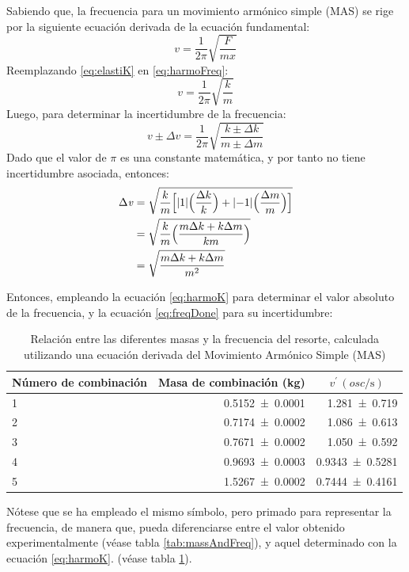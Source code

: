 \documentclass[../main.tex]{subfiles}
\begin{document}
Sabiendo que, la frecuencia para un movimiento armónico simple (MAS) se rige por la siguiente ecuación derivada de la ecuación fundamental:
\begin{equation}
  \mathit{v} = \frac{1}{2\pi} \sqrt{\frac{F}{mx}}
  \label{eq:harmoFreq}
\end{equation}
Reemplazando \ref{eq:elastiK} en \ref{eq:harmoFreq}:
\begin{equation}
  \mathit{v} = \frac{1}{2\pi} \sqrt{\frac{k}{m}}
  \label{eq:harmoK}
\end{equation}
Luego, para determinar la incertidumbre de la frecuencia:
\begin{equation*}
  \mathit{v} \pm \Delta \mathit {v} = \frac{1}{2\pi} \sqrt{\frac{k \pm \Delta k}{m \pm \Delta m}}
\end{equation*}
Dado que el valor de $\pi$ es una constante matemática, y por tanto no tiene incertidumbre asociada, entonces:
\begin{align}
  \Delta \mathit{v} &= \sqrt{\frac{k}{m}\Bigl[\abs{1}\Bigl(\frac{\Delta k}{k}\Bigr) + \abs{-1}\Bigl(\frac{\Delta m}{m}\Bigr)\Bigr]} \nonumber \\
  &= \sqrt{\frac{k}{m} \Bigl(\frac{m \Delta k + k \Delta m}{km}\Bigr)} \nonumber \\
  &= \sqrt{\frac{m \Delta k + k \Delta m}{m^2}}
  \label{eq:freqDone}
\end{align}

Entonces, empleando la ecuación \ref{eq:harmoK} para determinar el valor absoluto de la frecuencia, y la ecuación \ref{eq:freqDone} para su incertidumbre:
\begin{table}[H]
  \caption{Relación entre las diferentes masas y la frecuencia del resorte, calculada utilizando una ecuación derivada del Movimiento Armónico Simple (MAS)}
  \label{tab:theoreticalMeasurements}
  \begin{center}
    \begin{tabular}[c]{lrr}
      \toprule
      \multicolumn{1}{c}{Número de combinación} &
      \multicolumn{1}{c}{Masa de combinación (\unit{\kilo\gram})} &
      \multicolumn{1}{c}{$\mathit{v^\prime} \, (\unit{osc\per\second})$} \\
      \midrule
      1 & \num{0.5152 +- 0.0001} & \num{1.281 +- 0.719} \\
      2 & \num{0.7174 +- 0.0002} & \num{1.086 +- 0.613} \\
      3 & \num{0.7671 +- 0.0002} & \num{1.050 +- 0.592} \\
      4 & \num{0.9693 +- 0.0003} & \num{0.9343 +- 0.5281} \\
      5 & \num{1.5267 +- 0.0002} & \num{0.7444 +- 0.4161} \\
      \bottomrule
    \end{tabular}
  \end{center}
\end{table}
Nótese que se ha empleado el mismo símbolo, pero primado para representar la frecuencia, de manera que, pueda diferenciarse entre el valor obtenido experimentalmente (véase tabla \ref{tab:massAndFreq}), y aquel determinado con la ecuación \ref{eq:harmoK}. (véase tabla \ref{tab:theoreticalMeasurements}).
\end{document}

